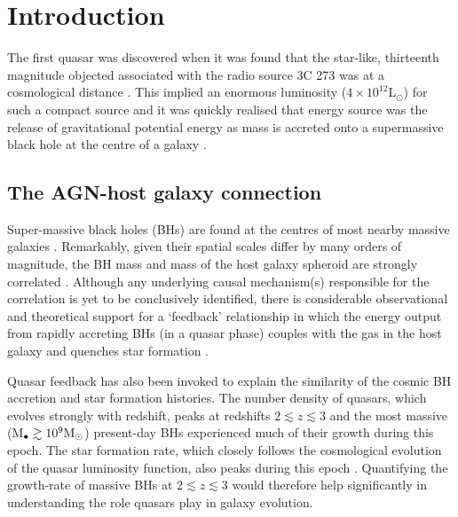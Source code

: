 
\chapter{Introduction}
\label{ch:intro}

The first quasar was discovered when it was found that the star-like, thirteenth magnitude objected associated with the radio source 3C 273 was at a cosmological distance \citep[$z=0.158$;][]{schmidt63}. 
This implied an enormous luminosity ($4\times10^{12}$L$_\odot$) for such a compact source and it was quickly realised that energy source was the release of gravitational potential energy as mass is accreted onto a supermassive black hole at the centre of a galaxy \citep[e.g.][]{hoyle63,salpeter64,lynden-bell69,lynden-bell71}. 

\section{The AGN-host galaxy connection}

Super-massive black holes (BHs) are found at the centres of most nearby massive galaxies \citep[e.g.][]{kormendy95,ferrarese05,kormendy13}.
Remarkably, given their spatial scales differ by many orders of magnitude, the BH mass and mass of the host galaxy spheroid are strongly correlated \citep{ferrarese00,gebhardt00,graham01,tremaine02,marconi03,aller07,gultekin09}.  
Although any underlying causal mechanism(s) responsible for the correlation is yet to be conclusively identified, there is considerable observational and theoretical support for a `feedback' relationship in which the energy output from rapidly accreting BHs (in a quasar phase) couples with the gas in the host galaxy and quenches star formation \citep[e.g.][]{silk98,king03,dimatteo05,king15}. 

Quasar feedback has also been invoked to explain the similarity of the cosmic BH accretion and star formation histories.
The number density of quasars, which evolves strongly with redshift, peaks at redshifts $2 \lesssim z \lesssim 3$ \citep[e.g.][]{brandt05,richards06b} and the most massive (M$_\bullet \gtrsim 10^9{{{\rm M_\odot}}}$) present-day BHs experienced much of their growth during this epoch.  
The star formation rate, which closely follows the cosmological evolution of the quasar luminosity function, also peaks during this epoch \citep[e.g.][]{boyle98}. 
Quantifying the growth-rate of massive BHs at $2 \lesssim z \lesssim 3$ would therefore help significantly in understanding the role quasars play in galaxy evolution.

